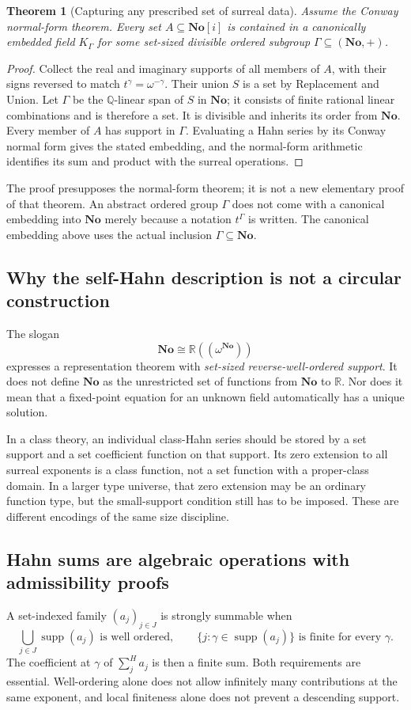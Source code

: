 \documentclass[11pt,letterpaper]{article}
\numberwithin{equation}{section}
\newtheorem{theorem}{Theorem}[section]
\theoremstyle{definition}
\theoremstyle{remark}
\newcommand{\No}{\mathbf{No}}
\newcommand{\SC}{\mathbf{No}[i]}
\newcommand{\R}{\mathbb{R}}
\newcommand{\Q}{\mathbb{Q}}
\newcommand{\supp}{\operatorname{supp}}
\newcommand{\hSum}{\mathop{\sum}\nolimits^{\!H}}
\begin{document}
\begin{theorem}[Capturing any prescribed set of surreal data]\label{thm:workspace}
Assume the Conway normal-form theorem. Every set $A\subseteq\SC$ is contained in a canonically embedded field $K_\Gamma$ for some set-sized divisible ordered subgroup $\Gamma\subseteq(\No,+)$.
\end{theorem}
\begin{proof}
Collect the real and imaginary supports of all members of $A$, with their signs reversed to match $t^\gamma=\omega^{-\gamma}$. Their union $S$ is a set by Replacement and Union. Let $\Gamma$ be the $\Q$-linear span of $S$ in $\No$; it consists of finite rational linear combinations and is therefore a set. It is divisible and inherits its order from $\No$. Every member of $A$ has support in $\Gamma$. Evaluating a Hahn series by its Conway normal form gives the stated embedding, and the normal-form arithmetic identifies its sum and product with the surreal operations.
\end{proof}

The proof presupposes the normal-form theorem; it is not a new elementary proof of that theorem. An abstract ordered group $\Gamma$ does not come with a canonical embedding into $\No$ merely because a notation $t^\Gamma$ is written. The canonical embedding above uses the actual inclusion $\Gamma\subseteq\No$.

\subsection{Why the self-Hahn description is not a circular construction}
The slogan
\[
 \No\cong\R((\omega^{\No}))
\]
expresses a representation theorem with \emph{set-sized reverse-well-ordered support}. It does not define $\No$ as the unrestricted set of functions from $\No$ to $\R$. Nor does it mean that a fixed-point equation for an unknown field automatically has a unique solution.

In a class theory, an individual class-Hahn series should be stored by a set support and a set coefficient function on that support. Its zero extension to all surreal exponents is a class function, not a set function with a proper-class domain. In a larger type universe, that zero extension may be an ordinary function type, but the small-support condition still has to be imposed. These are different encodings of the same size discipline.

\subsection{Hahn sums are algebraic operations with admissibility proofs}
A set-indexed family $(a_j)_{j\in J}$ is strongly summable when
\begin{equation}\label{eq:summability}
 \bigcup_{j\in J}\supp(a_j)\text{ is well ordered},\qquad
 \{j:\gamma\in\supp(a_j)\}\text{ is finite for every }\gamma.
\end{equation}
The coefficient at $\gamma$ of $\hSum_j a_j$ is then a finite sum. Both requirements are essential. Well-ordering alone does not allow infinitely many contributions at the same exponent, and local finiteness alone does not prevent a descending support.
\end{document}
